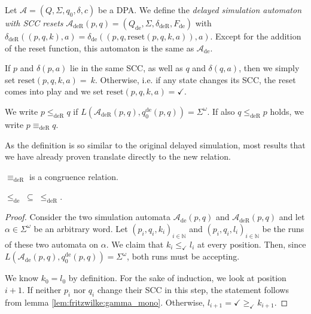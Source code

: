 \begin{defn}
	Let $\mathcal{A} = (Q, \Sigma, q_0, \delta, c)$ be a DPA. We define the \emph{delayed simulation automaton with SCC resets} $\mathcal{A}_\text{deR}(p, q) = (Q_\text{de}, \Sigma, \delta_\text{deR}, F_\text{de})$ with $\delta_\text{deR}((p, q, k), a) = \delta_\text{de}((p, q, \text{reset}(p, q, k, a)), a)$. Except for the addition of the reset function, this automaton is the same as $\mathcal{A}_\text{de}$.
	
	If $p$ and $\delta(p, a)$ lie in the same SCC, as well as $q$ and $\delta(q, a)$, then we simply set $\text{reset}(p, q, k, a) =~k$. Otherwise, i.e. if any state changes its SCC, the reset comes into play and we set $\text{reset}(p, q, k, a) = \checkmark$.
	
	We write $p \leq_\text{deR} q$ if $L(\mathcal{A}_\text{deR}(p, q), q_0^\text{de}(p, q)) = \Sigma^\omega$. If also $q \leq_\text{deR} p$ holds, we write $p \equiv_\text{deR} q$.
\end{defn}

As the definition is so similar to the original delayed simulation, most results that we have already proven translate directly to the new relation. 

\begin{theorem}
	$\equiv_\text{deR}$ is a congruence relation.
\end{theorem}

\begin{lem}
	$\leq_\text{de} \;\subseteq\; \leq_\text{deR}$.
\end{lem}

\begin{proof} 
	Consider the two simulation automata $\mathcal{A}_\text{de}(p, q)$ and $\mathcal{A}_\text{deR}(p, q)$ and let $\alpha \in \Sigma^\omega$ be an arbitrary word. Let $(p_i, q_i, k_i)_{i \in \mathbb{N}}$ and $(p_i, q_i, l_i)_{i \in \mathbb{N}}$ be the runs of these two automata on $\alpha$. We claim that $k_i \leq_\checkmark l_i$ at every position. Then, since $L(\mathcal{A}_\text{de}(p, q), q_0^\text{de}(p, q)) = \Sigma^\omega$, both runs must be accepting.
	
	We know $k_0 = l_0$ by definition. For the sake of induction, we look at position $i+1$. If neither $p_i$ nor $q_i$ change their SCC in this step, the statement follows from lemma \ref{lem:fritzwilke:gamma_mono}. Otherwise, $l_{i+1} = \checkmark \geq_\checkmark k_{i+1}$.
\end{proof}

\vspace{5pt}

